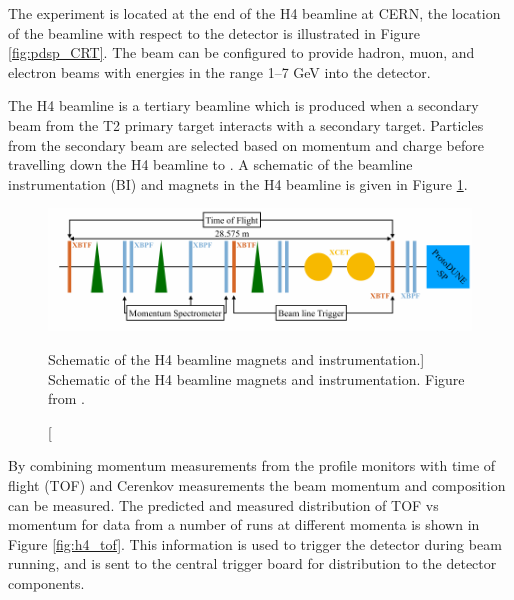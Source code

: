 The \protodune{} experiment is located at the end of the H4 beamline at CERN,
the location of the beamline with respect to the detector is illustrated in
Figure \ref{fig:pdsp_CRT}.  The beam can be configured to provide hadron, 
muon, and electron beams with energies in the range 1--7 GeV into the 
detector. 

The H4 beamline is a tertiary beamline which is produced when a secondary beam
from the T2 primary target interacts with a secondary target. Particles from the
secondary beam are selected based on momentum and charge before travelling down
the H4 beamline to \protodune{}. A schematic of the beamline instrumentation
(BI) and magnets in the H4 beamline is given in Figure \ref{fig:h4_schem}. 

\begin{figure}

	\centering

	\includegraphics[width=\textwidth]{figures/h4_schem.pdf}

	\caption
	[Schematic of the H4 beamline magnets and instrumentation.]
	{Schematic of the H4 beamline magnets and instrumentation. Figure from
	\cite{protoduneperf}.}

	\label{fig:h4_schem}

\end{figure}

By combining momentum measurements from the profile monitors with time of flight
(TOF) and Cerenkov measurements the beam momentum and composition can be 
measured. The predicted and measured distribution of TOF vs momentum for data 
from a number of runs at different momenta is shown in Figure \ref{fig:h4_tof}.
This information is used to trigger the detector during beam running, and is
sent to the central trigger board for distribution to the detector components.

